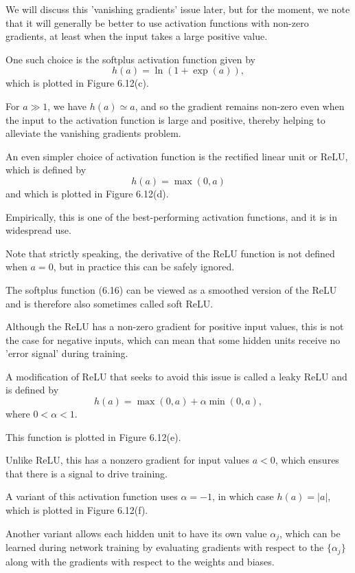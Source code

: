 \documentclass{article}
\begin{document}
We will discuss this 'vanishing gradients' issue later, but for the moment, we note that it will generally be better to use activation functions with non-zero gradients, at least when the input takes a large positive value. 

One such choice is the softplus activation function given by
\begin{equation}
h(a) = \ln(1 + \exp(a)), \tag{6.16}
\end{equation}
which is plotted in Figure 6.12(c). 

For $a \gg 1$, we have $h(a) \simeq a$, and so the gradient remains non-zero even when the input to the activation function is large and positive, thereby helping to alleviate the vanishing gradients problem.

An even simpler choice of activation function is the rectified linear unit or ReLU, which is defined by
\begin{equation}
h(a) = \max(0, a) \tag{6.17}
\end{equation}
and which is plotted in Figure 6.12(d). 

Empirically, this is one of the best-performing activation functions, and it is in widespread use. 

Note that strictly speaking, the derivative of the ReLU function is not defined when $a = 0$, but in practice this can be safely ignored. 

The softplus function (6.16) can be viewed as a smoothed version of the ReLU and is therefore also sometimes called soft ReLU.

Although the ReLU has a non-zero gradient for positive input values, this is not the case for negative inputs, which can mean that some hidden units receive no 'error signal' during training. 

A modification of ReLU that seeks to avoid this issue is called a leaky ReLU and is defined by
\begin{equation}
h(a) = \max(0, a) + \alpha \min(0, a), \tag{6.18}
\end{equation}
where $0 < \alpha < 1$. 

This function is plotted in Figure 6.12(e). 

Unlike ReLU, this has a nonzero gradient for input values $a < 0$, which ensures that there is a signal to drive training. 

A variant of this activation function uses $\alpha = -1$, in which case $h(a) = |a|$, which is plotted in Figure 6.12(f). 

Another variant allows each hidden unit to have its own value $\alpha_j$, which can be learned during network training by evaluating gradients with respect to the $\{\alpha_j\}$ along with the gradients with respect to the weights and biases.
\end{document}
